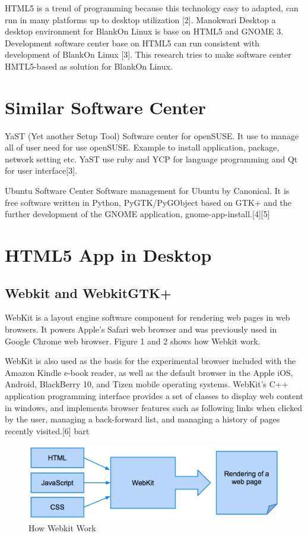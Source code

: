 \documentclass[conference, letterpaper]{IEEEtran}
\begin{document}
HTML5 is a trend of programming because this technology easy to adapted, can run in many platforms up to desktop utilization [2]. Manokwari Desktop a desktop environment for BlankOn Linux is base on HTML5 and GNOME 3. Development software center base on HTML5 can run consistent with development of BlankOn Linux [3]. This research tries to make software center HMTL5-based as solution for BlankOn Linux.

\section{Similar Software Center}

YaST (Yet another Setup Tool)
Software center for openSUSE. It use to manage all of user need for use openSUSE. Example to install application, package, network setting etc. YaST use ruby and YCP for language programming and Qt for user interface[3].

Ubuntu Software Center
Software management for Ubuntu by Canonical. It is free software written in Python, PyGTK/PyGObject based on GTK+ and the further development of the GNOME application, gnome-app-install.[4][5]

\section{HTML5 App in Desktop}

\subsection{Webkit and WebkitGTK+}
WebKit is a layout engine software component for rendering web pages in web browsers. It powers Apple's Safari web browser and was previously used in Google Chrome web browser. Figure 1 and 2 shows how Webkit work.

WebKit is also used as the basis for the experimental browser included with the Amazon Kindle e-book reader, as well as the default browser in the Apple iOS, Android, BlackBerry 10, and Tizen mobile operating systems. WebKit's C++ application programming interface provides a set of classes to display web content in windows, and implements browser features such as following links when clicked by the user, managing a back-forward list, and managing a history of pages recently visited.[6] bart

\begin{figure}[hbtp]
\centering
\includegraphics[scale=0.5]{image/webkit.png}
\caption{How Webkit Work}
\end{figure}
\end{document}
